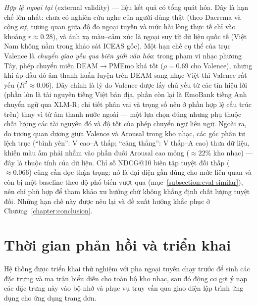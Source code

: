 \documentclass[../DoAn.tex]{subfiles}
\begin{document}
\textit{Hợp lệ ngoại tại} (external validity) --- liệu kết quả có tổng quát hóa. Đây là hạn chế lớn nhất: chưa có nghiên cứu nghe của người dùng thật (theo Dacrema và cộng sự, tương quan giữa độ đo ngoại tuyến và mức hài lòng thực tế chỉ vào khoảng $r \approx 0.28$), và ánh xạ màu--cảm xúc là ngoại suy từ dữ liệu quốc tế (Việt Nam không nằm trong khảo sát ICEAS gốc). Một hạn chế cụ thể của trục Valence là \textit{chuyển giao yếu qua biên giới văn hóa}: trong phạm vi nhạc phương Tây, phép chuyển miền DEAM$\to$PMEmo khá tốt ($\rho = 0.69$ cho Valence), nhưng khi áp đầu dò âm thanh huấn luyện trên DEAM sang nhạc Việt thì Valence rất yếu ($R^2 \approx 0.06$). Đây chính là lý do Valence được lấy chủ yếu từ các tín hiệu lời (phần lớn là tài nguyên tiếng Việt bản địa, phần còn lại là EmoBank tiếng Anh chuyển ngữ qua XLM-R; chi tiết phân vai và trọng số nêu ở phần hợp lệ cấu trúc trên) thay vì từ âm thanh nước ngoài --- một lựa chọn đúng nhưng phụ thuộc chất lượng các tài nguyên đó và độ tốt của phép chuyển ngữ liên ngữ. Ngoài ra, do tương quan dương giữa Valence và Arousal trong kho nhạc, các góc phần tư lệch trục (``bình yên'': V cao--A thấp; ``căng thẳng'': V thấp--A cao) thưa dữ liệu, khiến màu ấm phải nhắm vào phần đuôi Arousal cao mỏng ($\approx 22\%$ kho nhạc) --- đây là thuộc tính của dữ liệu. Chỉ số NDCG@10 biên tập tuyệt đối thấp ($\approx 0.066$) cũng cần đọc thận trọng: nó là đại diện gần đúng cho mức liên quan và còn bị một baseline theo độ phổ biến vượt qua (mục~\ref{subsection:eval-similar}), nên chỉ phù hợp để tham khảo xu hướng chứ không khẳng định chất lượng tuyệt đối. Những hạn chế này được nêu lại và đề xuất hướng khắc phục ở Chương~\ref{chapter:conclusion}.

\section{Thời gian phản hồi và triển khai}
\label{section:deploy}
Hệ thống được triển khai thử nghiệm với pha ngoại tuyến chạy trước để sinh các đặc trưng và ma trận biểu diễn cho toàn bộ kho nhạc, sau đó động cơ gợi ý nạp các đặc trưng này vào bộ nhớ và phục vụ truy vấn qua giao diện lập trình ứng dụng cho ứng dụng trang đơn.
\end{document}
